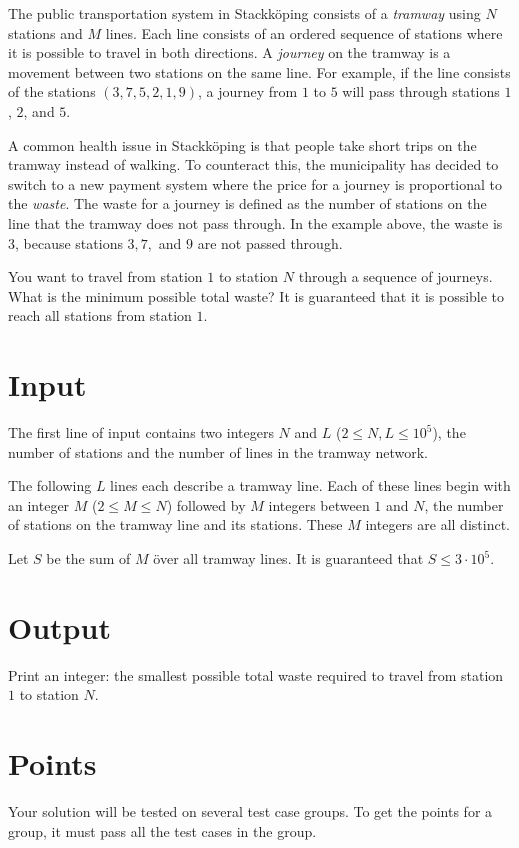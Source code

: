 \noindent
The public transportation system in Stackköping consists of a \textit{tramway} using $N$ stations and $M$ lines.
Each line consists of an ordered sequence of stations where it is possible to travel in both directions.
A \textit{journey} on the tramway is a movement between two stations on the same line.
For example, if the line consists of the stations $(3,7,5,2,1,9)$, a journey from $1$ to $5$
will pass through stations $1$, $2$, and $5$.

A common health issue in Stackköping is that people take short trips on the tramway instead
of walking. To counteract this, the municipality has decided to switch to a new payment system
where the price for a journey is proportional to the \textit{waste}. The waste for a journey
is defined as the number of stations on the line that the tramway does not pass through. In the example above,
the waste is $3$, because stations $3,7,$ and $9$ are not passed through.

You want to travel from station $1$ to station $N$ through a sequence of journeys.
What is the minimum possible total waste?
It is guaranteed that it is possible to reach all stations from station $1$.

\section*{Input}
The first line of input contains two integers $N$ and $L$ ($2 \leq N,L \leq 10^5$),
the number of stations and the number of lines in the tramway network.

The following $L$ lines each describe a tramway line. Each of these lines begin with an
integer $M$ ($2 \le M \le N$) followed by $M$ integers between $1$ and $N$, the number of
stations on the tramway line and its stations. These $M$ integers are all distinct.

Let $S$ be the sum of $M$ över all tramway lines. It is guaranteed that $S \leq 3 \cdot 10^5$.

\section*{Output}
Print an integer: the smallest possible total waste required to travel from station $1$ to
station $N$.

\section*{Points}
Your solution will be tested on several test case groups.
To get the points for a group, it must pass all the test cases in the group.

